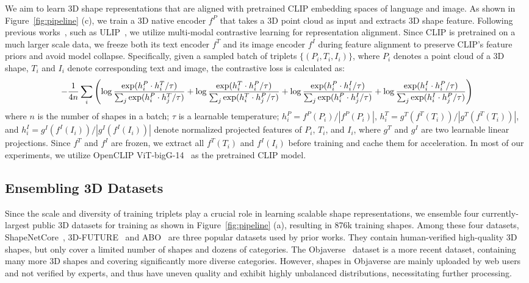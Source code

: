 We aim to learn 3D shape representations that are aligned with pretrained CLIP embedding spaces of language and image. As shown in Figure~\ref{fig:pipeline} (c), we train a 3D native encoder $f^P$ that takes a 3D point cloud as input and extracts 3D shape feature. Following previous works~\cite{qi2023contrast,xue2022ulip,hegde2023clip}, such as ULIP~\cite{xue2022ulip}, we utilize multi-modal contrastive learning for representation alignment. Since CLIP is pretrained on a much larger scale data, we freeze both its text encoder $f^T$ and its image encoder $f^I$ during feature alignment to preserve CLIP's feature priors and avoid model collapse. Specifically, given a sampled batch of triplets $\{(P_i, T_i, I_i)\}$, where $P_i$ denotes a point cloud of a 3D shape, $T_i$ and $I_i$ denote corresponding text and image, the contrastive loss is calculated as: 
\begin{equation}
\scriptsize
-\frac{1}{4n} \sum_i\left(\log\frac{\exp(h_i^P\cdot h_i^T/\tau)}{\sum_j \exp(h_i^P\cdot h_j^T/\tau)} +
\log\frac{\exp(h_i^T\cdot h_i^P/\tau)}{\sum_j \exp(h_i^T\cdot h_j^P/\tau)} + 
\log\frac{\exp(h_i^P\cdot h_i^I/\tau)}{\sum_j \exp(h_i^P\cdot h_j^I/\tau)} +
\log\frac{\exp(h_i^I\cdot h_i^P/\tau)}{\sum_j \exp(h_i^I\cdot h_j^P/\tau)}\right) 
\end{equation}
where $n$ is the number of shapes in a batch; $\tau$ is a learnable temperature; $h_i^P=f^P(P_i)/|f^P(P_i)|$, $h_i^T=g^T(f^T(T_i))/|g^T(f^T(T_i))|$, and  $h_i^I=g^I(f^I(I_i))/|g^I(f^I(I_i))|$ denote normalized projected features of $P_i$, $T_i$, and $I_i$, where $g^T$ and $g^I$ are two learnable linear projections. Since $f^T$ and $f^I$ are frozen, we extract all $f^T(T_i)$ and $f^I(I_i)$ before training and cache them for acceleration. In most of our experiments, we utilize OpenCLIP ViT-bigG-14~\cite{ilharco_gabriel_2021_5143773} as the pretrained CLIP model.

\vspace{-0.5em}
\subsection{Ensembling 3D Datasets}
\label{sec:ensemble-datasets}
\vspace{-0.5em}

Since the scale and diversity of training triplets play a crucial role in learning scalable shape representations, we ensemble four currently-largest public 3D datasets for training as shown in Figure~\ref{fig:pipeline} (a), resulting in 876k training shapes. Among these four datasets, ShapeNetCore~\cite{chang2015shapenet}, 3D-FUTURE~\cite{fu20213d} and ABO~\cite{collins2022abo} are three popular datasets used by prior works. They contain human-verified high-quality 3D shapes, but only cover a limited number of shapes and dozens of categories. The Objaverse~\cite{objaverse} dataset is a more recent dataset, containing many more 3D shapes and covering significantly more diverse categories. However, shapes in Objaverse are mainly uploaded by web users and not verified by experts, and thus have uneven quality and exhibit highly unbalanced distributions, necessitating further processing. 

